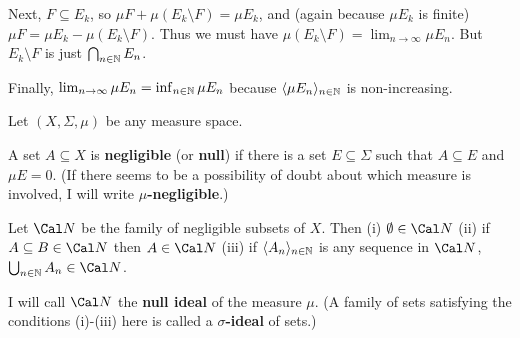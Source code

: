 {

\noindent   Next, $F\subseteq E_k$, so
$\mu F+\mu(E_k\setminus F)=\mu E_k$, and (again because $\mu E_k$ is
finite) $\mu F=\mu E_k-\mu(E_k\setminus F)$.   Thus we must have
$\mu(E_k\setminus F)=\lim_{n\to\infty}\mu E_n$.   But $E_k\setminus F$
is just $\bigcap_{n\in\Bbb N}E_n$.

Finally, $\lim_{n\to\infty}\mu E_n=\inf_{n\in\Bbb N}\mu E_n$ because
$\langle\mu E_n\rangle_{n\in\Bbb N}$ is non-increasing.
}%

\medskip



 Let $(X,\Sigma,\mu)$ be any measure
space.

 A set $A\subseteq X$ is {\bf negligible} (or
{\bf null}) if
there is a set $E\subseteq\Sigma$ such that $A\subseteq E$ and
$\mu E=0$.   (If there seems to be a possibility of doubt about which measure is involved, I will write {\bf $\mu$-negligible}.)

 Let $\Cal N$ be the family of negligible subsets
of $X$.
Then (i) $\emptyset\in\Cal N$ (ii) if $A\subseteq B\in\Cal N$ then
$A\in\Cal N$ (iii) if $\langle A_n\rangle_{n\in\Bbb N}$ is any sequence
in $\Cal N$, $\bigcup_{n\in\Bbb N}A_n\in\Cal N$.   

I will call $\Cal N$ the {\bf null ideal} of the measure $\mu$.
(A family of sets satisfying the conditions (i)-(iii) here is called a
{\bf $\sigma$-ideal} of sets.)


